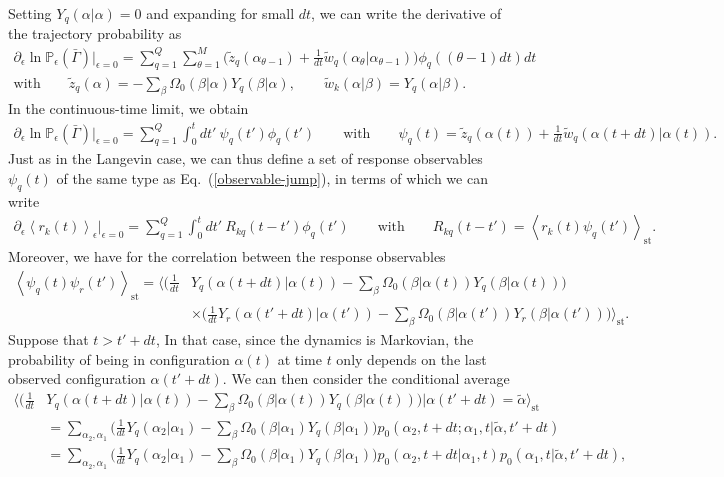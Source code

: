 \documentclass[aps,pre,twocolumn,superscriptaddress,notitlepage]{revtex4-2}
\newcommand{\Av}[1]{\left\langle #1 \right\rangle}
\newcommand{\nn}{\nonumber \\}
\newcommand{\n}{\nonumber}
\renewcommand{\eqref}[1]{Eq.~(\ref{#1})}
\begin{document}
Setting $Y_q(\alpha \vert \alpha) = 0$ and expanding for small $dt$, we can write the derivative of the trajectory probability as
\begin{gather}
\partial_\epsilon \ln \mathbb{P}_\epsilon(\bar{\Gamma}) \Big\vert_{\epsilon = 0} = \sum_{q = 1}^Q \sum_{\theta = 1}^M \bigg(\tilde{z}_q(\alpha_{\theta-1}) + \frac{1}{dt} \tilde{w}_q(\alpha_\theta \vert \alpha_{\theta-1})\bigg) \phi_q((\theta-1)dt) dt  \\
\text{with} \qquad \tilde{z}_q(\alpha) = - \sum_{\beta} \Omega_0(\beta \vert \alpha) Y_q(\beta \vert \alpha), \qquad \tilde{w}_k(\alpha \vert \beta) = Y_q(\alpha \vert \beta) \n .
\end{gather}
In the continuous-time limit, we obtain
\begin{align}
\partial_\epsilon \ln \mathbb{P}_\epsilon(\bar{\Gamma}) \Big\vert_{\epsilon = 0} = \sum_{q=1}^Q \int_0^t dt' \ \psi_q(t') \phi_q(t') \qquad
\text{with} \qquad \psi_q(t) = \tilde{z}_q(\alpha(t)) + \frac{1}{dt} \tilde{w}_q(\alpha(t+dt) \vert \alpha(t)) .
\end{align}
Just as in the Langevin case, we can thus define a set of response observables $\psi_q(t)$ of the same type as \eqref{observable-jump}, in terms of which we can write
\begin{align}
\partial_\epsilon \Av{r_k(t)}_\epsilon \Big\vert_{\epsilon = 0} = \sum_{q = 1}^Q \int_0^t dt' \ R_{kq}(t-t') \phi_q(t') \qquad \text{with} \qquad R_{kq}(t-t') = \Av{r_k(t) \psi_q(t')}_\text{st} .
\end{align}
Moreover, we have for the correlation between the response observables
\begin{align}
\Av{\psi_q(t) \psi_r(t')}_\text{st} = \Bigg\langle \bigg(\frac{1}{dt} &Y_q(\alpha(t+dt)\vert \alpha(t)) - \sum_{\beta} \Omega_0(\beta \vert \alpha(t)) Y_q(\beta \vert \alpha(t)) \bigg) \\
&\times \bigg(\frac{1}{dt} Y_r(\alpha(t'+dt)\vert \alpha(t')) - \sum_{\beta} \Omega_0(\beta \vert \alpha(t')) Y_r(\beta \vert \alpha(t')) \bigg) \Bigg\rangle_\text{st} \n .
\end{align}
Suppose that $t > t'+dt$,
In that case, since the dynamics is Markovian, the probability of being in configuration $\alpha(t)$ at time $t$ only depends on the last observed configuration $\alpha(t'+dt)$.
We can then consider the conditional average
\begin{align}
\Bigg\langle \bigg(\frac{1}{dt} &Y_q(\alpha(t+dt)\vert \alpha(t)) - \sum_{\beta} \Omega_0(\beta \vert \alpha(t)) Y_q(\beta \vert \alpha(t)) \bigg) \bigg\vert \alpha(t'+dt) = \tilde{\alpha} \Bigg\rangle_\text{st} \\
& = \sum_{\alpha_2,\alpha_1} \bigg( \frac{1}{dt} Y_q(\alpha_2 \vert \alpha_1) - \sum_{\beta} \Omega_0(\beta \vert \alpha_1) Y_q(\beta \vert \alpha_1) \bigg) p_0(\alpha_2, t+dt; \alpha_1,t \vert \tilde{\alpha}, t'+dt)  \nn
& = \sum_{\alpha_2,\alpha_1} \bigg( \frac{1}{dt} Y_q(\alpha_2 \vert \alpha_1) - \sum_{\beta} \Omega_0(\beta \vert \alpha_1) Y_q(\beta \vert \alpha_1) \bigg) p_0(\alpha_2, t+dt \vert \alpha_1,t) p_0(\alpha_1,t \vert \tilde{\alpha}, t'+dt) \n ,
\end{align}
\end{document}
